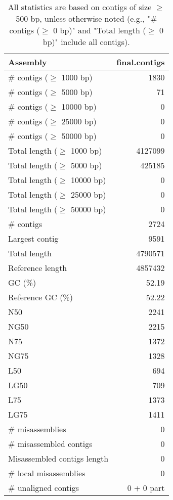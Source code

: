 \documentclass[12pt,a4paper]{article}
\begin{document}
\begin{table}[ht]
\begin{center}
\caption{All statistics are based on contigs of size $\geq$ 500 bp, unless otherwise noted (e.g., "\# contigs ($\geq$ 0 bp)" and "Total length ($\geq$ 0 bp)" include all contigs).}
\begin{tabular}{|l*{1}{|r}|}
\hline
Assembly & final.contigs \\ \hline
\# contigs ($\geq$ 1000 bp) & 1830 \\ \hline
\# contigs ($\geq$ 5000 bp) & 71 \\ \hline
\# contigs ($\geq$ 10000 bp) & 0 \\ \hline
\# contigs ($\geq$ 25000 bp) & 0 \\ \hline
\# contigs ($\geq$ 50000 bp) & 0 \\ \hline
Total length ($\geq$ 1000 bp) & 4127099 \\ \hline
Total length ($\geq$ 5000 bp) & 425185 \\ \hline
Total length ($\geq$ 10000 bp) & 0 \\ \hline
Total length ($\geq$ 25000 bp) & 0 \\ \hline
Total length ($\geq$ 50000 bp) & 0 \\ \hline
\# contigs & 2724 \\ \hline
Largest contig & 9591 \\ \hline
Total length & 4790571 \\ \hline
Reference length & 4857432 \\ \hline
GC (\%) & 52.19 \\ \hline
Reference GC (\%) & 52.22 \\ \hline
N50 & 2241 \\ \hline
NG50 & 2215 \\ \hline
N75 & 1372 \\ \hline
NG75 & 1328 \\ \hline
L50 & 694 \\ \hline
LG50 & 709 \\ \hline
L75 & 1373 \\ \hline
LG75 & 1411 \\ \hline
\# misassemblies & 0 \\ \hline
\# misassembled contigs & 0 \\ \hline
Misassembled contigs length & 0 \\ \hline
\# local misassemblies & 0 \\ \hline
\# unaligned contigs & 0 + 0 part \\ \hline

\end{tabular}
\end{center}
\end{table}
\end{document}
